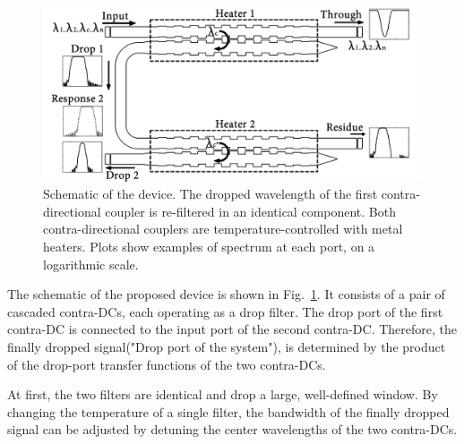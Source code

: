 \documentclass[9pt,twocolumn,twoside]{osajnl}
\begin{document}
	\begin{figure}[htbp]
		\centering
		\includegraphics[width=1.00\columnwidth]{data/CascadedSchematic2}
		\centering
		\caption{Schematic of the device. 
			The dropped wavelength of the first contra-directional coupler is re-filtered in an identical component. 
			Both contra-directional couplers are temperature-controlled with metal heaters. 
			Plots show examples of spectrum at each port, on a logarithmic scale.}
		\label{fig:schematic}
	\end{figure}
	
	The schematic of the proposed device is shown in Fig.~\ref{fig:schematic}. 
	It consists of a pair of cascaded contra-DCs, each operating as a drop filter. 
	The drop port of the first contra-DC is connected to the input port of the second contra-DC. 
	Therefore, the finally dropped signal("Drop port of the system"), is determined by the product of the  drop-port transfer functions of the two contra-DCs. 
	
	At first, the two filters are identical and drop a large, well-defined window. By changing the temperature of a single filter, the bandwidth of the finally dropped signal can be adjusted by detuning the center wavelengths of the two contra-DCs.
	
	
	
\end{document}

